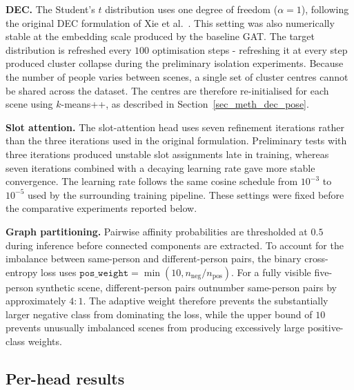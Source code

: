 \begin{compactitem}

\item \textbf{DEC.}
The Student's $t$ distribution uses one degree of freedom
($\alpha = 1$),
following the original DEC formulation of Xie et al.~\cite{xie2016dec}.
This setting was also numerically stable at the embedding scale
produced by the baseline GAT.
The target distribution is refreshed every $100$ optimisation steps -
refreshing it at every step produced cluster collapse during the
preliminary isolation experiments.
Because the number of people varies between scenes,
a single set of cluster centres cannot be shared across the dataset.
The centres are therefore re-initialised for each scene using
$k$-means++,
as described in Section~\ref{sec_meth_dec_pose}.

\item \textbf{Slot attention.}
The slot-attention head uses seven refinement iterations
rather than the three iterations used in the original formulation.
Preliminary tests with three iterations produced unstable slot
assignments late in training,
whereas seven iterations combined with a decaying learning rate
gave more stable convergence.
The learning rate follows the same cosine schedule from $10^{-3}$
to $10^{-5}$ used by the surrounding training pipeline.
These settings were fixed before the comparative experiments
reported below.

\item \textbf{Graph partitioning.}
Pairwise affinity probabilities are thresholded at $0.5$ during
inference before connected components are extracted.
To account for the imbalance between same-person and different-person
pairs,
the binary cross-entropy loss uses
$\mathtt{pos\_weight} =
\min(10,n_{\text{neg}}/n_{\text{pos}})$.
For a fully visible five-person synthetic scene,
different-person pairs outnumber same-person pairs by approximately $4:1$.
The adaptive weight therefore prevents the substantially larger
negative class from dominating the loss,
while the upper bound of $10$ prevents unusually imbalanced scenes
from producing excessively large positive-class weights.

\end{compactitem}

\subsection{Per-head results}
\label{sec_res_learned_heads_per_head}

